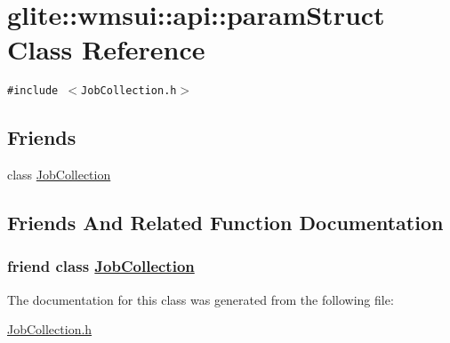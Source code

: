 \hypertarget{classglite_1_1wmsui_1_1api_1_1paramStruct}{
\section{glite::wmsui::api::param\-Struct Class Reference}
\label{classglite_1_1wmsui_1_1api_1_1paramStruct}
}
{\tt \#include $<$Job\-Collection.h$>$}

\subsection*{Friends}
\begin{CompactItemize}
\item 
class \hyperlink{classglite_1_1wmsui_1_1api_1_1paramStruct_n0}{Job\-Collection}
\end{CompactItemize}


\subsection{Friends And Related Function Documentation}
\hypertarget{classglite_1_1wmsui_1_1api_1_1paramStruct_n0}{
\subsubsection[JobCollection]{\setlength{\rightskip}{0pt plus 5cm}friend class \hyperlink{classglite_1_1wmsui_1_1api_1_1JobCollection}{Job\-Collection}}}
\label{classglite_1_1wmsui_1_1api_1_1paramStruct_n0}




The documentation for this class was generated from the following file:\begin{CompactItemize}
\item 
\hyperlink{JobCollection_8h}{Job\-Collection.h}\end{CompactItemize}

